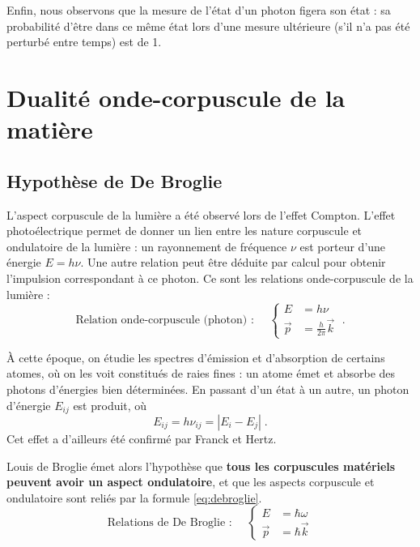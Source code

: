 \documentclass[12pt, a4paper]{book}
\begin{document}
Enfin, nous observons que la mesure de l'état d'un photon figera son état : sa probabilité d'être dans ce même état lors d'une mesure ultérieure (s'il n'a pas été perturbé entre temps) est de 1.

\section{Dualité onde-corpuscule de la matière}
\subsection{Hypothèse de De Broglie}
L'aspect corpuscule de la lumière a été observé lors de l'effet Compton. L'effet photoélectrique permet de donner un lien entre les nature corpuscule et ondulatoire de la lumière : un rayonnement de fréquence $\nu$ est porteur d'une énergie $E = h\nu$. Une autre relation peut être déduite par calcul pour obtenir l'impulsion correspondant à ce photon. Ce sont les relations onde-corpuscule de la lumière :
\begin{equation}
\boxed{
\text{Relation onde-corpuscule (photon) : } \quad \left\{ \begin{array}{ll}
E &= h\nu \\
\vec p &= \frac{h}{2\pi} \vec k
\end{array} \right. } \; .
\end{equation}

À cette époque, on étudie les spectres d'émission et d'absorption de certains atomes, où on les voit constitués de raies fines : un atome émet et absorbe des photons d'énergies bien déterminées. En passant d'un état à un autre, un photon d'énergie $E_{ij}$ est produit, où
$$E_{ij} = h\nu_{ij} = |E_i - E_j| \; .$$
Cet effet a d'ailleurs été confirmé par Franck et Hertz. \\


Louis de Broglie émet alors l'hypothèse que \textbf{tous les corpuscules matériels peuvent avoir un aspect ondulatoire}, et que les aspects corpuscule et ondulatoire sont reliés par la formule \eqref{eq:debroglie}.
\begin{equation} \label{eq:debroglie}
\boxed{
\text{Relations de De Broglie : } \quad \left\{ \begin{array}{ll}
E &= \hbar \omega \\
\vec p &= \hbar \vec k
\end{array} \right. } 
\end{equation}
\end{document}

